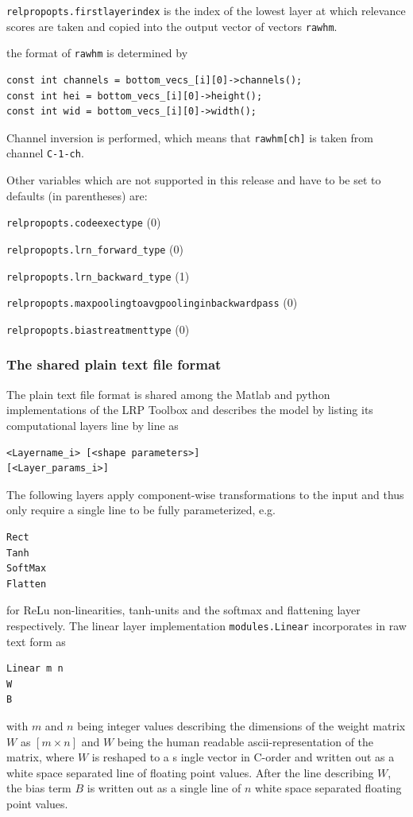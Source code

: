 \documentclass[a4wide]{article}
\begin{document}
\begin{itemize}
\texttt{relpropopts.firstlayerindex} is the index of the lowest layer at which relevance scores are taken and copied into the output vector of vectors \texttt{rawhm}.

the format of \texttt{rawhm} is determined by
\begin{verbatim}
const int channels = bottom_vecs_[i][0]->channels();
const int hei = bottom_vecs_[i][0]->height();
const int wid = bottom_vecs_[i][0]->width();
\end{verbatim}

Channel inversion is performed, which means that \texttt{rawhm[ch]} is taken from channel \texttt{C-1-ch}.

Other variables which are not supported in this release and have to be set to defaults (in parentheses) are:

\texttt{relpropopts.codeexectype} (0)

\texttt{relpropopts.lrn\_forward\_type} (0)

\texttt{relpropopts.lrn\_backward\_type} (1)

\texttt{relpropopts.maxpoolingtoavgpoolinginbackwardpass} (0)

\texttt{relpropopts.biastreatmenttype} (0)




\end{itemize}



\subsubsection*{The shared plain text file format}


		The plain text file format is shared among the Matlab and python implementations of the LRP Toolbox and describes
        the model by listing its computational layers line by line as

        \begin{verbatim}
<Layername_i> [<shape parameters>]
[<Layer_params_i>]
        \end{verbatim}

     	The following layers apply component-wise transformations to the input and thus only require a single line to be fully parameterized, e.g.

     	\begin{verbatim}
Rect
Tanh
SoftMax
Flatten
        \end{verbatim}
        for ReLu non-linearities, tanh-units and the softmax and flattening layer respectively. The linear layer implementation \texttt{modules.Linear} incorporates in raw text form as
        \begin{verbatim}
Linear m n
W
B
       \end{verbatim}
        with $m$ and $n$ being integer values describing the dimensions of the weight matrix $W$ as $[m \times n]$ and
        $W$ being the human readable ascii-representation of the matrix, where $W$ is reshaped to a s	ingle vector in C-order and written out as a
        white space separated line of floating point values.
        After the line describing $W$, the bias term $B$ is written out as a single line of $n$ white space separated floating point values.
\end{document}
